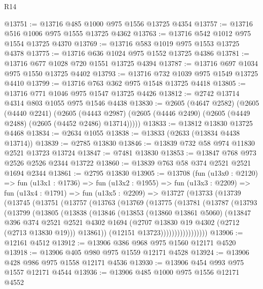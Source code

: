 \begin{lexlean}{R14}
\begin{coremodule}
@13751 := @13716 @485 @1000 @975 @1556 @13725 @4354
@13757 := @13716 @516 @1006 @975 @1555 @13725 @4362
@13763 := @13716 @542 @1012 @975 @1554 @13725 @4370
@13769 := @13716 @583 @1019 @975 @1553 @13725 @4378
@13775 := @13716 @636 @1024 @975 @1552 @13725 @4386
@13781 := @13716 @677 @1028 @720 @1551 @13725 @4394
@13787 := @13716 @697 @1034 @975 @1550 @13725 @4402
@13793 := @13716 @732 @1039 @975 @1549 @13725 @4410
@13799 := @13716 @763 @362 @975 @1548 @13725 @4418
@13805 := @13716 @771 @1046 @975 @1547 @13725 @4426
@13812 := @2742 @13714 @4314 @803 @1055 @975 @1546 @4438
@13830 := @2605
    (@4647 @2582)
    (@2605
      (@4440 @2241)
      (@2605
        (@4443 @2987)
        (@2605 (@4446 @2490) (@2605 (@4449 @2488) (@2605 (@4452 @2486) @13714)))))
@13833 := @13812 @13830 @13725 @4468
@13834 := @2634 @1055
@13838 := @13833 (@2633 (@13834 @4438 @13714))
@13839 := @2785 @13830
@13846 := @13839 @732 @58 @974 @11830 @2521 @13723 @13724
@13847 := @7481 @13830
@13853 := @13847 @768 @973 @2526 @2526 @2344 @13722
@13860 := @13839 @763 @58 @374 @2521 @2521 @1694 @2344
@13861 := @2795 @13830
@13905 := @13708
    (fun (u13x0 : @2120) =>
    fun (u13x1 : @1736) =>
    fun (u13x2 : @1955) =>
    fun (u13x3 : @2209) =>
    fun (u13x4 : @1791) =>
    fun (u13x5 : @2209) =>
    @13727
      (@13733
        (@13739
          (@13745
            (@13751
              (@13757
                (@13763
                  (@13769
                    (@13775
                      (@13781
                        (@13787
                          (@13793
                            (@13799
                              (@13805
                                (@13838
                                  (@13846
                                    (@13853
                                      (@13860 @13861 @5060)
                                      (@13847
                                        @396
                                        @374
                                        @2521
                                        @2521
                                        @4302
                                        @1694
                                        (@2707 @13830 @19 @4302 (@2712 (@2713 @13830 @19)))
                                        @13861))
                                    (@12151 @13723)))))))))))))))))
@13906 := @12161 @4512
@13912 := @13906 @386 @968 @975 @1560 @12171 @4520
@13918 := @13906 @405 @980 @975 @1559 @12171 @4528
@13924 := @13906 @428 @986 @975 @1558 @12171 @4536
@13930 := @13906 @454 @993 @975 @1557 @12171 @4544
@13936 := @13906 @485 @1000 @975 @1556 @12171 @4552

\end{coremodule}
\end{lexlean}
